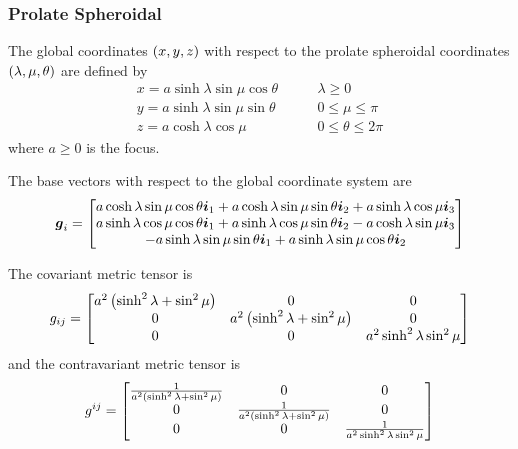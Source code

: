 \subsubsection{Prolate Spheroidal}

The global coordinates $\left( x,y,z \right)$ with respect to the prolate spheroidal
coordinates $\left( \lambda,\mu,\theta \right)$ are defined by
\begin{equation}
  \begin{aligned}
    x = a\sinh\lambda\sin\mu\cos\theta & \qquad \lambda \ge 0 \\
    y = a\sinh\lambda\sin\mu\sin\theta & \qquad 0 \le \mu \le \pi \\
    z = a\cosh\lambda\cos\mu & \qquad 0 \le \theta \le 2\pi 
  \end{aligned}
\end{equation}
where $a\ge0$ is the focus.

The base vectors with respect to the global coordinate system are
\begin{equation}
  \boldsymbol{g}_{i}=\begin{bmatrix} 
    a\cosh\lambda\sin\mu\cos\theta\boldsymbol{i}_{1}+a\cosh\lambda\sin\mu\sin\theta\boldsymbol{i}_{2}+a\sinh\lambda\cos\mu\boldsymbol{i}_{3}\\ 
    a\sinh\lambda\cos\mu\cos\theta\boldsymbol{i}_{1}+a\sinh\lambda\cos\mu\sin\theta\boldsymbol{i}_{2}-a\cosh\lambda\sin\mu\boldsymbol{i}_{3}\\
    -a\sinh\lambda\sin\mu\sin\theta\boldsymbol{i}_{1}+a\sinh\lambda\sin\mu\cos\theta\boldsymbol{i}_{2}
  \end{bmatrix}
\end{equation}

The covariant metric tensor is
\begin{equation}
  g_{ij}=\begin{bmatrix}
    a^{2}\left( \sinh^{2}\lambda+\sin^{2}\mu \right) & 0 & 0 \\
    0 & a^{2}\left( \sinh^{2}\lambda+\sin^{2}\mu \right) & 0 \\
    0 & 0 & a^{2}\sinh^{2}\lambda\sin^{2}\mu 
  \end{bmatrix}
\end{equation}
and the contravariant metric tensor is
\begin{equation}
  g^{ij}=\begin{bmatrix}
    \frac{1}{a^{2}\left( \sinh^{2}\lambda+\sin^{2}\mu \right)}& 0 & 0 \\
    0 & \frac{1}{a^{2}\left( \sinh^{2}\lambda+\sin^{2}\mu \right)} & 0 \\
    0 & 0 & \frac{1}{a^{2}\sinh^{2}\lambda\sin^{2}\mu} 
  \end{bmatrix}
\end{equation}

